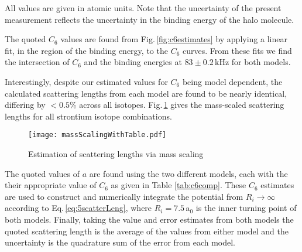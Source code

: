 \begin{table}[]
\centering
{}
\caption{Comparison of $C_6$ values from literature}{All values are given in atomic units. Note that the uncertainty of the present measurement reflects the uncertainty in the binding energy of the halo molecule.}
\label{tab:c6comp}
\end{table}
The quoted $C_6$ values are found from Fig.\,\ref{fig:c6estimates} by applying a linear fit, in the region of the binding energy, to the $C_6$ curves.
From these fits we find the intersection of $C_6$ and the binding energies at $83 \pm 0.2$\,kHz for both models.

Interestingly, despite our estimated values for $C_6$ being model dependent, the calculated scattering lengths from each model are found to be nearly identical, differing by $< 0.5$\% across all isotopes.
Fig.\,\ref{fig:massScaling} gives the mass-scaled scattering lengths for all strontium isotope combinations.
	\begin{figure} 
	\centerline{
	  \texttt{[image: massScalingWithTable.pdf]}}
	  \caption{Estimation of scattering lengths via mass scaling}{}
	  \label{fig:massScaling}
	\end{figure}
The quoted values of $a$ are found using the two different models, each with the their appropriate value of $C_6$ as given in Table \ref{tab:c6comp}.
These $C_6$ estimates are used to construct and numerically integrate the potential from $R_i\rightarrow\infty$ according to Eq.\,\ref{eq:5scatterLeng}, where $R_i=7.5$\,a$_0$ is the inner turning point of both models.
Finally, taking the value and error estimates from both models the quoted scattering length is the average of the values from either model and the uncertainty is the quadrature sum of the error from each model.


